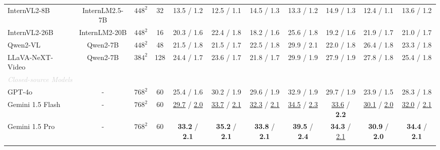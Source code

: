 \begin{table*}[t]
{\begin{threeparttable}
\begin{tabular}{l|c|c|c|cccccc|c}
InternVL2-8B~\cite{chen2024far} & InternLM2.5-7B & $448^{2}$  & 32  & 13.5 / 1.2 & 12.5 / 1.1 & 14.5 / 1.3 & 13.3 / 1.2  & 14.9 / 1.3  & 12.4 / 1.1 & 13.6 / 1.2 \\
InternVL2-26B~\cite{chen2024far} & InternLM2-20B & $448^{2}$  & 16  &  20.3 / 1.6 & 22.4 / 1.8  & 18.2 / 1.6  & 25.6 / 1.8 & 19.2 / 1.6 & 21.9 / 1.7 & 21.0 / 1.7    \\ 
Qwen2-VL~\cite{wang2024qwen2} & Qwen2-7B & $448^{2}$ & 48 & {21.5} / {1.8}  & {21.5} / {1.7}  & {22.5} / {1.8} & {29.9} / {2.1}  & {22.0} / {1.8}  & {26.4} / {1.8} & 23.3 / {1.8}    \\
LLaVA-NeXT-Video~\cite{zhang2024llavanextvideo} & Qwen2-7B &  $384^{2}$ & 128 & {24.4} / {1.7} & {23.6} / {1.7} & {21.8} / {1.7} & {29.9} / {1.9}  & {27.9} / {1.9}  & {27.8} / {1.8} & {25.4} / {1.8}  \\ 
\hline
\multicolumn{11}{l}{\emph{\textcolor{lightgray}{Closed-source Models}}} \\ 
GPT-4o~\cite{achiam2023gpt} & - & $768^{2}$ & 60 & 25.4 / 1.6 & 30.2 / 1.9  & 29.6 / 1.9  & 32.9 / 1.9  & 29.7 / 1.9 & 23.9 / 1.5 & 28.3 / 1.8   \\ 
Gemini 1.5 Flash~\cite{reid2024gemini} & - & $768^{2}$ & 60 & \underline{29.7} / \underline{2.0} & \underline{33.7} / \underline{2.1} & \underline{32.3} / \underline{2.1}  & \underline{34.5} / \underline{2.3}  & \underline{33.6} / \textbf{2.2}  & \underline{30.1} / \underline{2.0}  & \underline{32.0} / \underline{2.1}  \\ 
Gemini 1.5 Pro~\cite{reid2024gemini} & - & $768^{2}$ & 60  & \textbf{33.2} / \textbf{2.1} & \textbf{35.2} / \textbf{2.1}  & \textbf{33.8} / \textbf{2.1}  & \textbf{39.5} / \textbf{2.4}  & \textbf{34.3} / \underline{2.1} & \textbf{30.9} / \textbf{2.0} & \textbf{34.4} / \textbf{2.1}   \\ 
\Xhline{1pt}
\end{tabular}
\end{threeparttable}}
\vspace{-0.4cm}
\end{table*}

